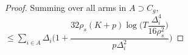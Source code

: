 \begin{proof}
\newline
Summing over all arms in $A \supset C_{g}$,
\newline
\hspace*{4em}$\leq\sum_{i\in A}\Delta_{i}\bigg(1+\dfrac{32\rho_{s}(K+p)\log{(T\dfrac{\Delta_{i}^{4}}{16\rho_{s}^{2}}})}{p\Delta_{i}^{2}}\bigg)$
\newline


\end{proof}

